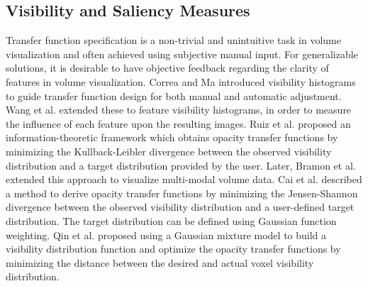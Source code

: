 \documentclass{egpubl}
\begin{document}
\subsection{Visibility and Saliency Measures}
Transfer function specification is a non-trivial and unintuitive task in volume visualization and often achieved using subjective manual input. For generalizable solutions, it is desirable to have objective feedback regarding the clarity of features in volume visualization.
Correa and Ma \cite{correa_visibility-driven_2009} introduced visibility histograms to guide transfer function design for both manual and automatic adjustment.
Wang et al. \cite{wang_efficient_2011} extended these to feature visibility histograms, in order to measure the influence of each feature upon the resulting images.
Ruiz et al. \cite{ruiz_automatic_2011} proposed an information-theoretic framework which obtains opacity transfer functions by minimizing the Kullback-Leibler divergence between the observed visibility distribution and a target distribution provided by the user. Later, Bramon et al. \cite{bramon_information_2013} extended this approach to visualize multi-modal volume data.
Cai et al. \cite{cai_automatic_2013} described a method to derive opacity transfer functions by minimizing the Jensen-Shannon divergence between the observed visibility distribution and a user-defined target distribution. The target distribution can be defined using Gaussian function weighting.
Qin et al. \cite{qin_voxel_2015} proposed using a Gaussian mixture model to build a visibility distribution function and optimize the opacity transfer functions by minimizing the distance between the desired and actual voxel visibility distribution.
\end{document}
